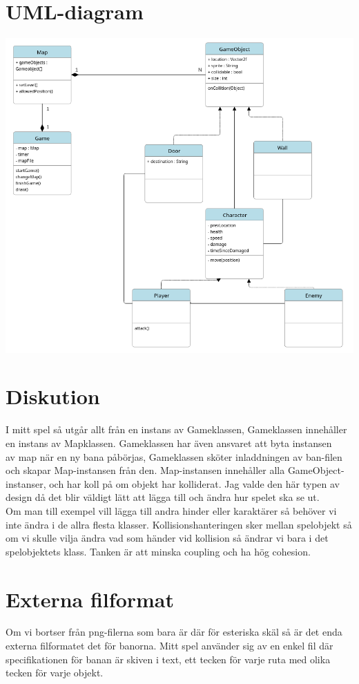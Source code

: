 \documentclass{TDP005mall}
\begin{document}
\section{UML-diagram}
\includegraphics[scale=0.52]{uml-diagram}

\newpage
\section{Diskution}
I mitt spel så utgår allt från en instans av Gameklassen, Gameklassen innehåller en instans av Mapklassen. Gameklassen har även ansvaret att byta instansen \\
av map när en ny bana påbörjas, Gameklassen sköter inladdningen av ban-filen och skapar Map-instansen från den. 
Map-instansen innehåller alla GameObject-instanser, och har koll på om objekt har kolliderat.
Jag valde den här typen av design då det blir väldigt lätt att lägga till och ändra hur spelet ska se ut. \\
Om man till exempel vill lägga till andra hinder eller karaktärer så behöver vi inte ändra i de allra flesta klasser.
Kollisionshanteringen sker mellan spelobjekt så om vi skulle vilja ändra vad som händer vid kollision så ändrar vi bara i det spelobjektets klass.
Tanken är att minska coupling och ha hög cohesion.

\section{Externa filformat}
Om vi bortser från png-filerna som bara är där för esteriska skäl så är det enda externa filformatet det för banorna.
Mitt spel använder sig av en enkel fil där specifikationen för banan är skiven i text, ett tecken för varje ruta med olika tecken för varje objekt.
\end{document}

